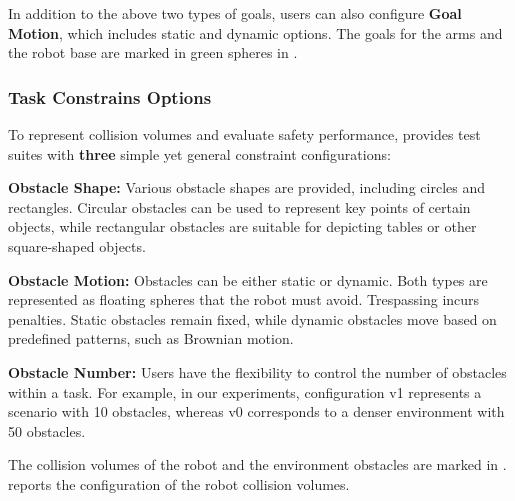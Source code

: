 
In addition to the above two types of goals, users can also configure \textbf{Goal Motion}, which includes static and dynamic options. The goals for the arms and the robot base are marked in green spheres in . 
\subsubsection{Task Constrains Options}
To represent collision volumes and evaluate safety performance, \spark provides test suites with \textbf{three} simple yet general constraint configurations:  



\textbf{Obstacle Shape:}
Various obstacle shapes are provided, including circles and rectangles. Circular obstacles can be used to represent key points of certain objects, while rectangular obstacles are suitable for depicting tables or other square-shaped objects.

\textbf{Obstacle Motion:}
Obstacles can be either static or dynamic. Both types are represented as floating spheres that the robot must avoid. Trespassing incurs penalties. Static obstacles remain fixed, while dynamic obstacles move based on predefined patterns, such as Brownian motion.

\textbf{Obstacle Number:}
Users have the flexibility to control the number of obstacles within a task. For example, in our experiments, configuration v1 represents a scenario with 10 obstacles, whereas v0 corresponds to a denser environment with 50 obstacles. 


The collision volumes of the robot and the environment obstacles are marked in .  reports the configuration of the robot collision volumes.

